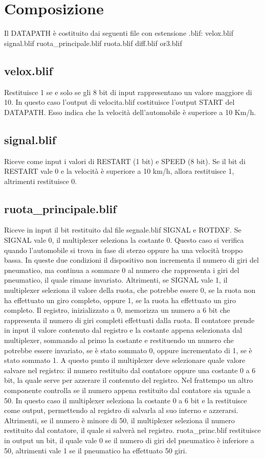 \documentclass[a4paper,titlepage]{book}
\begin{document}
\section{Composizione}

Il DATAPATH è costituito dai seguenti file con estensione .blif: velox.blif signal.blif ruota\_principale.blif ruota.blif diff.blif or3.blif


\subsection{velox.blif}
Restituisce 1 se e solo se gli 8 bit di input rappresentano un valore maggiore di 10. In questo caso l’output di velocita.blif costituisce l’output START del DATAPATH. Esso indica che la velocità dell’automobile è superiore a 10 Km/h.

\subsection{signal.blif}
Riceve come input i valori di RESTART (1 bit) e SPEED (8 bit). Se il bit di RESTART vale 0 e la velocità è superiore a 10 km/h, allora restituisce 1, altrimenti restituisce 0.

\subsection{ruota\_principale.blif}
Riceve in input il bit restituito dal file segnale.blif SIGNAL e ROTDXF.  Se SIGNAL vale 0, il multiplexer seleziona la costante 0. Questo caso si verifica quando  l’automobile si trova in fase di sterzo oppure ha una velocità troppo bassa. In queste due  condizioni il dispositivo non incrementa il numero di giri del pneumatico, ma continua a  sommare 0 al numero che rappresenta i giri del pneumatico, il quale rimane invariato.  Altrimenti, se SIGNAL vale 1, il multiplexer seleziona il valore della ruota, che potrebbe  essere 0, se la ruota non ha effettuato un giro completo, oppure 1, se la ruota ha  effettuato un giro completo.  Il registro, inizializzato a 0, memorizza un numero a 6 bit che rappresenta il numero di giri  completi effettuati dalla ruota.  Il contatore prende in input il valore contenuto dal registro e la costante appena  selezionata dal multiplexer, sommando al primo la costante e restituendo un numero che  potrebbe essere invariato, se è stato sommato 0, oppure incrementato di 1, se è stato  sommato 1.  A questo punto il multiplexer deve selezionare quale valore salvare nel registro: il numero  restituito dal contatore oppure una costante 0 a 6 bit, la quale serve per azzerare il  contenuto del registro.  Nel frattempo un altro componente controlla se il numero appena restituito dal contatore  sia uguale a 50. In questo caso il multiplexer seleziona la costante 0 a 6 bit e la restituisce  come output, permettendo al registro di salvarla al suo interno e azzerarsi. Altrimenti, se il  numero è minore di 50, il multiplexer seleziona il numero restituito dal contatore, il quale si  salverà nel registro.  ruota\_princ.blif restituisce in output un bit, il quale vale 0 se il numero di giri del  pneumatico è inferiore a 50, altrimenti vale 1 se il pneumatico ha effettuato 50 giri.
\end{document}
